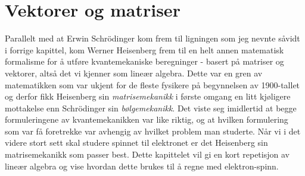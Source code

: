 \chapter{Vektorer og matriser}

Parallelt med at Erwin Schr\"odinger kom frem til ligningen som jeg nevnte såvidt i forrige kapittel, kom Werner Heisenberg frem til en helt annen matematisk formalisme for å utføre kvantemekaniske beregninger - basert på matriser og vektorer, altså det vi kjenner som lineær algebra. Dette var en gren av matematikken som var ukjent for de fleste fysikere på begynnelsen av 1900-tallet og derfor fikk Heisenberg sin \emph{matrisemekanikk} i første omgang en litt kjøligere mottakelse enn Schr\"odinger sin \emph{bølgemekanikk}. Det viste seg imidlertid at begge formuleringene av kvantemekanikken var like riktig, og at hvilken formulering som var få foretrekke var avhengig av hvilket problem man studerte. Når vi i det videre stort sett skal studere spinnet til elektronet er det Heisenberg sin matrisemekanikk som passer best. Dette kapittelet vil gi en kort repetisjon av lineær algebra og vise hvordan dette brukes til å regne med elektron-spinn.

